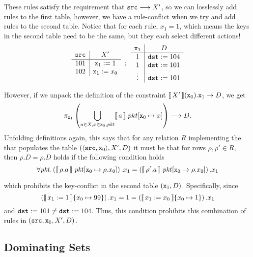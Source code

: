 These rules satisfy the requirement that
$\texttt{src}\longrightarrow X'$, so we can losslessly add rules to
the first table, however, we have a rule-conflict when we try and add
rules to the second table. Notice that for each rule, $x_1 = 1$, which
means the keys in the second table need to be the same, but they each
select different actions!
\[
  \begin{array}{c|c}
    \texttt{src} & X'\\ \hline
    101 & \texttt{x}_1 := 1  \\
    102 & \texttt{x}_1 := x_0 \\
  \end{array}\enspace ; \enspace
  \begin{array}{c|c}
    \texttt{x}_1 & D\\ \hline
    1 & \texttt{dst} := 104 \\
    1 & \texttt{dst} := 101 \\
    \vdots & \texttt{dst} := 101 \\
  \end{array}  
\]

However, if we unpack the definition of the constraint
$\llbracket\,X'\,\rrbracket(\texttt{x}_0).\texttt{x}_1 \to D$, we get
\[\pi_{\texttt{x}_1}\left(\bigcup_{a \in X, x \in
      \texttt{x}_0,\mathit{pkt}} \llbracket\,a\,\rrbracket\; pkt[\texttt{x}_0 \mapsto x]
  \right) \longrightarrow D.\] Unfolding definitions again, this says
that for any relation $R$ implementing the that populates the table
$(\langle\texttt{src},\texttt{x}_0\rangle, X', D)$ it must be that for
rows $\rho, \rho' \in R$, then $\rho.D = \rho.D$ holds if the
following condition holds
\[\forall \mathit{pkt}. \left(\llbracket\,\rho.a\,\rrbracket\; \mathit{pkt}[\texttt{x}_0 \mapsto
    \rho.x_0 ]\right).x_1 =
  \left(\llbracket\,\rho'.a\,\rrbracket\;\mathit{pkt}[\texttt{x}_0\mapsto \rho.x_0
    ]\right).x_1\]

which prohibits the key-conflict in the second table
$(\texttt{x}_1,D)$. Specifically, since
\[\left(\llbracket\,x_1:=1\,\rrbracket \{x_0 \mapsto 99\}\right).x_1 = 1 =
  \left(\llbracket\,x_1:=x_0\,\rrbracket \{x_0 \mapsto 1\}\right).x_1\] and
$\texttt{dst} := 101 \neq \texttt{dst} := 104$. Thus, this condition
prohibits this combination of rules in
$(\texttt{src}, \texttt{x}_0, X', D)$.


\subsection{Dominating Sets}

